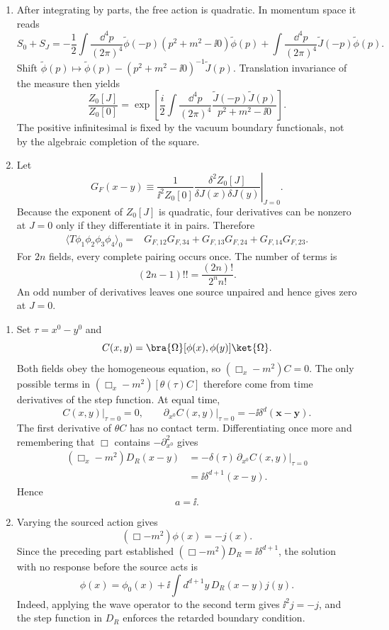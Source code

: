 \begin{enumerate}
\begin{enumerate}
\item
After integrating by parts, the free action is quadratic.  In momentum
space it reads
\[
 S_0+S_J=
 -\frac12\int\frac{\dd^4p}{(2\pi)^4}
 \widetilde\phi(-p)(p^2+m^2-\ii0)\widetilde\phi(p)
 +\int\frac{\dd^4p}{(2\pi)^4}\widetilde J(-p)\widetilde\phi(p).
\]
Shift
\(\widetilde\phi(p)\mapsto\widetilde\phi(p)
-(p^2+m^2-\ii0)^{-1}\widetilde J(p)\).  Translation invariance of the
measure then yields
\[
 \boxed{\quad
 \frac{Z_0[J]}{Z_0[0]}
 =\exp\left[\frac i2\int\frac{\dd^4p}{(2\pi)^4}
 \frac{\widetilde J(-p)\widetilde J(p)}
 {p^2+m^2-\ii0}\right].
 \quad}
\]
The positive infinitesimal is fixed by the vacuum boundary functionals,
not by the algebraic completion of the square.
\item
Let
\[
 G_F(x-y)\equiv
 \left.\frac1{\ii^2Z_0[0]}
 \frac{\delta^2Z_0[J]}{\delta J(x)\delta J(y)}
 \right|_{J=0}.
\]
Because the exponent of \(Z_0[J]\) is quadratic, four derivatives can be
nonzero at \(J=0\) only if they differentiate it in pairs.  Therefore
\[
 \begin{split}
 \langle T\phi_1\phi_2\phi_3\phi_4\rangle_0={}&
 G_{F,12}G_{F,34}+G_{F,13}G_{F,24}
 +G_{F,14}G_{F,23}.
 \end{split}
\]
For \(2n\) fields, every complete pairing occurs once.  The number of
terms is
\[
 (2n-1)!!=\frac{(2n)!}{2^n n!}.
\]
An odd number of derivatives leaves one source unpaired and hence gives
zero at \(J=0\).
\end{enumerate}

\begin{enumerate}
\item
Set \(\tau=x^0-y^0\) and
\[
 C(x,y)=\bra{\Omega}[\phi(x),\phi(y)]\ket{\Omega}.
\]
Both fields obey the homogeneous equation, so
\((\Box_x-m^2)C=0\).  The only possible terms in
\((\Box_x-m^2)[\theta(\tau)C]\) therefore come from time derivatives of
the step function.  At equal time,
\[
 C(x,y)\big|_{\tau=0}=0,\qquad
 \partial_{x^0}C(x,y)\big|_{\tau=0}
 =-\ii\delta^d(\mathbf x-\mathbf y).
\]
The first derivative of \(\theta C\) has no contact term.  Differentiating
once more and remembering that \(\Box\) contains
\(-\partial_{x^0}^2\) gives
\[
\begin{split}
 (\Box_x-m^2)D_R(x-y)
 &=-\delta(\tau)\,
 \partial_{x^0}C(x,y)\big|_{\tau=0}\\
 &=\ii\delta^{d+1}(x-y).
\end{split}
\]
Hence
\[
 \boxed{a=\ii.}
\]
\item
Varying the sourced action gives
\[
 (\Box-m^2)\phi(x)=-j(x).
\]
Since the preceding part established
\((\Box-m^2)D_R=\ii\delta^{d+1}\), the solution with no response before the
source acts is
\[
 \boxed{\;
 \phi(x)=\phi_0(x)+\ii\int d^{d+1}y\,D_R(x-y)j(y).
 \;}
\]
Indeed, applying the wave operator to the second term gives
\(\ii^2j=-j\), and the step function in \(D_R\) enforces the retarded
boundary condition.


\end{enumerate}
\end{enumerate}

